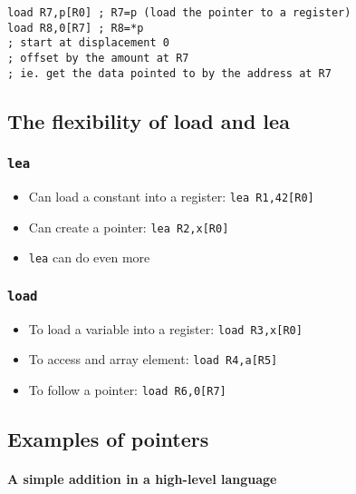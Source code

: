 \begin{verbatim}
load R7,p[R0] ; R7=p (load the pointer to a register)
load R8,0[R7] ; R8=*p
; start at displacement 0
; offset by the amount at R7
; ie. get the data pointed to by the address at R7
\end{verbatim}

\subsection{The flexibility of load and lea}\label{sub:the_flexibility_of_load_and_lea}

\subsubsection[LEA]{\texttt{lea}}\label{ssub:lea}

\begin{itemize}
	\item Can load a constant into a register: \texttt{lea R1,42[R0]}
	\item Can create a pointer: \texttt{lea R2,x[R0]}
	\item \texttt{lea} can do even more
\end{itemize}

\subsubsection[LOAD]{\texttt{load}}\label{ssub:load}

\begin{itemize}
	\item To load a variable into a register: \texttt{load R3,x[R0]}
	\item To access and array element: \texttt{load R4,a[R5]}
	\item To follow a pointer: \texttt{load R6,0[R7]}
\end{itemize}

\subsection{Examples of pointers}\label{sub:examples_of_pointers}

\paragraph{A simple addition in a high-level language}\label{par:a_simple_addition_in_a_high_level_language}

